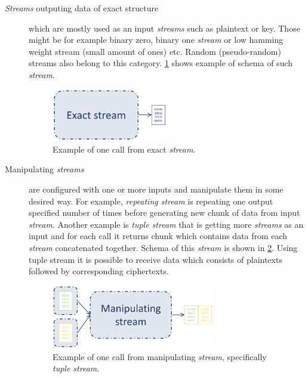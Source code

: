 \documentclass[
    digital,    %
    oneside,    %
    color,
    11pt,
    nocover,
    notable,
    nolof,
    nolot,
    final
]{fithesis3}
\begin{document}
\begin{description}
	\item[\textit{Streams} outputing data of exact structure] which are mostly used as an input \textit{streams} such as plaintext or key. Those might be for example binary zero, binary one \textit{stream} or low hamming weight stream (small amount of ones) etc. Random (pseudo-random) streams also belong to this category. \cref{fig:exact-stream} shows example of schema of such \textit{stream}.
	
	\begin{figure}[h]
		\centering
		\includegraphics[width=0.5\textwidth]{./images/pictures/exact-stream.png}
		\caption{Example of one call from exact \textit{stream}.}
		\label{fig:exact-stream}
	\end{figure}

	\item[Manipulating \textit{streams}] are configured with one or more inputs and manipulate them in some desired way. For example, \textit{repeating stream} is repeating one output specified number of times before generating new chunk of data from input \textit{stream}. Another example is \textit{tuple stream} that is getting more \textit{streams} as an input and for each call it returns chunk which contains data from each \textit{stream} concatenated together. Schema of this \textit{stream} is shown in \cref{fig:manipulating-stream}. Using tuple stream it is possible to receive data which consists of plaintexts followed by corresponding ciphertexts. 
	\begin{figure}[h]
		\centering
		\includegraphics[width=0.7\textwidth]{./images/pictures/manipulating-stream.png}
		\caption{Example of one call from manipulating \textit{stream}, specifically \textit{tuple stream}. }
		\label{fig:manipulating-stream}
	\end{figure}
	

\end{description}
\end{document}
